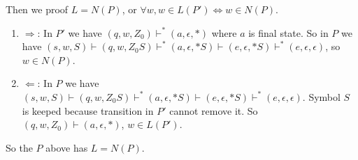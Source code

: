 \documentclass[10pt]{homework}
\begin{document}
\begin{solution}
\begin{parts}
        Then we proof $L=N\left( P \right) $, or $\forall w,w\in L\left( P' \right) \Leftrightarrow w\in N\left( P \right) $.
        \begin{enumerate}
            \item $\Rightarrow $: In $P'$ we have $\left( q,w,Z_0 \right) \vdash^{*}\left( a,\epsilon,* \right) $ where $a$ is final state. So in $P$ we have $\left( s,w,S \right) \vdash \left( q,w,Z_0S \right) \vdash^{*}\left( a,\epsilon,*S \right) \vdash \left( e,\epsilon,*S \right) \vdash^{*} \left( e,\epsilon,\epsilon \right) $, so $w\in N\left( P \right) $.
            \item $\Leftarrow$: In $P$ we have $\left( s,w,S \right) \vdash\left( q,w,Z_0S \right) \vdash^{*}\left( a,\epsilon,*S \right) \vdash \left( e,\epsilon,*S \right) \vdash^{*}\left( e,\epsilon,\epsilon\right) $. Symbol $S$ is keeped because transition in $P'$ cannot remove it. So $\left( q,w,Z_0 \right) \vdash \left( a,\epsilon,* \right) $, $w\in L\left( P' \right) $.
        \end{enumerate}
        So the $P$ above has $L=N\left( P \right) $.
    \end{parts}
\end{solution}
\end{document}

